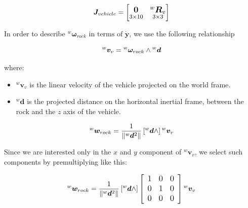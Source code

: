 \documentclass{article}
\begin{document}
\begin{equation}
\large
{\boldsymbol J_{vehicle}} = 
    \begin{bmatrix}
     \underset{3\times 10}{\boldsymbol{0}_{ }} & \underset{3\times 3}{^{w}\boldsymbol{R}_{v}}\\
    \end{bmatrix}
\end{equation}

In order to describe ${^w}\boldsymbol{\omega}_{rock} \text{ in terms of }  \boldsymbol{\dot{y}}$, we use the following relationship

\begin{equation}
\large
{^w}{\boldsymbol v}_{v}={^w}\boldsymbol \omega_{rock} \wedge {^w} \boldsymbol d
\end{equation}

where:
\begin{itemize}
\item ${^w}{\boldsymbol v}_{v}$ is the linear velocity of the vehicle projected on the world frame.
\item ${^w} \boldsymbol d$ is the projected distance on the horizontal inertial frame, between the rock and the $z$ axis of the vehicle.
\end{itemize}

\begin{equation}
\large
{^w}\boldsymbol w_{rock}=\frac{1}{\left\|{^w} \boldsymbol d^{2}\right\|}\left[{^w}{\boldsymbol d} \wedge\right] {{^w}{\boldsymbol v_{v}}}
\end{equation}

\noindent
Since we are interested only in the $x$ and $y$ component of ${^w}{\boldsymbol v_{v}}$, we select such components by premultiplying like this:

\begin{equation}
\large
{^w}\boldsymbol w_{rock}=\frac{1}{\left\|{^w} \boldsymbol d^{2}\right\|}\left[{^w}{\boldsymbol d} \wedge\right]\left[\begin{array}{lll}
1 & 0 & 0 \\
0 & 1 & 0 \\
0 & 0 & 0
\end{array}\right] {^w}{\boldsymbol v_{v}}
\end{equation}

\end{document}
